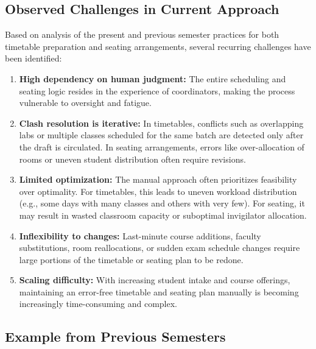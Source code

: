 \documentclass[12pt]{article}
\begin{document}
\subsection{Observed Challenges in Current Approach}

Based on analysis of the present and previous semester practices for both timetable preparation and seating arrangements, several recurring challenges have been identified:

\begin{enumerate}
    \item \textbf{High dependency on human judgment:} The entire scheduling and seating logic resides in the experience of coordinators, making the process vulnerable to oversight and fatigue.
    
    \item \textbf{Clash resolution is iterative:} In timetables, conflicts such as overlapping labs or multiple classes scheduled for the same batch are detected only after the draft is circulated. In seating arrangements, errors like over-allocation of rooms or uneven student distribution often require revisions.
    
    \item \textbf{Limited optimization:} The manual approach often prioritizes feasibility over optimality. For timetables, this leads to uneven workload distribution (e.g., some days with many classes and others with very few). For seating, it may result in wasted classroom capacity or suboptimal invigilator allocation.
    
    \item \textbf{Inflexibility to changes:} Last-minute course additions, faculty substitutions, room reallocations, or sudden exam schedule changes require large portions of the timetable or seating plan to be redone.
    
    \item \textbf{Scaling difficulty:} With increasing student intake and course offerings, maintaining an error-free timetable and seating plan manually is becoming increasingly time-consuming and complex.
\end{enumerate}


\subsection{Example from Previous Semesters}
\end{document}
